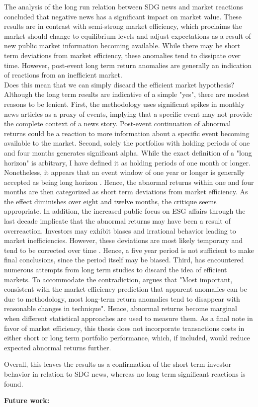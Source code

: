 The analysis of the long run relation between SDG news and market reactions concluded that negative news has a significant impact on market value. These results are in contrast with semi-strong market efficiency, which proclaims the market should change to equilibrium levels and adjust expectations as a result of new public market information becoming available. While there may be short term deviations from market efficiency, these anomalies tend to dissipate over time. However, post-event long term return anomalies are generally an indication of reactions from an inefficient market. \\
Does this mean that we can simply discard the efficient market hypothesis? Although the long term results are indicative of a simple "yes", there are modest reasons to be lenient. First, the methodology uses significant spikes in monthly news articles as a proxy of events, implying that a specific event may not provide the complete context of a news story. Post-event continuation of abnormal returns could be a reaction to more information about a specific event becoming available to the market. Second, solely the portfolios with holding periods of one and four months generates significant alpha. While the exact definition of a "long horizon" is arbitrary, I have defined it as holding periods of one month or longer. Nonetheless, it appears that  an event window of one year or longer is generally accepted as being long horizon \cite{kothari}. Hence, the abnormal returns within one and four months are then categorized as short term deviations from market efficiency. As the effect diminishes over eight and twelve months, the critique seems appropriate.
In addition, the increased public focus on ESG affairs through the last decade implicate that the abnormal returns may have been a result of overreaction. Investors may exhibit biases and irrational behavior leading to market inefficiencies. However, these deviations are most likely temporary and tend to be corrected over time \citep{fama1998_events}. Hence, a five year period is not sufficient to make final conclusions, since the period itself may be biased. Third, \citeauthor{fama1998_events} has encountered numerous attempts from long term studies to discard the idea of efficient markets. To accommodate the contradiction, \citeauthor{fama1998_events} argues that "Most important, consistent with the market efficiency prediction that apparent anomalies can be due to methodology, most long-term return anomalies tend to disappear with reasonable changes in technique". Hence, abnormal returns become marginal when different statistical approaches are used to measure them. As a final note in favor of market efficiency, this thesis does not incorporate transactions costs in either short or long term portfolio performance, which, if included, would reduce expected abnormal returns further. 

Overall, this leaves the results as a confirmation of the short term investor behavior in relation to SDG news, whereas no long term significant reactions is found. 





\textbf{Future work:}
